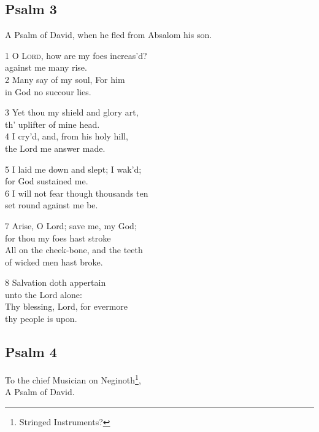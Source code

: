 \begin{center}
\quad{}\quad{}
\end{center}

\subsection*{Psalm 3}

A Psalm of David, when he fled from Absalom his son.

1 O \textsc{Lord}, how are my foes increas’d?\\
against me many rise.\\
2 Many say of my soul, For him\\
in God no succour lies.

3 Yet thou my shield and glory art,\\
th’ uplifter of mine head.\\
4 I cry’d, and, from his holy hill,\\
the Lord me answer made.

5 I laid me down and slept; I wak’d;\\
for God sustained me.\\
6 I will not fear though thousands ten\\
set round against me be.

7 Arise, O Lord; save me, my God;\\
for thou my foes hast stroke\\
All on the cheek-bone, and the teeth\\
of wicked men hast broke.

8 Salvation doth appertain\\
unto the Lord alone:\\
Thy blessing, Lord, for evermore\\
thy people is upon.

\begin{center}
\quad{}\quad{}
\end{center}


\subsection*{Psalm 4 }


To the chief Musician on Neginoth\footnote{Stringed Instruments?},\\
A Psalm of David.

